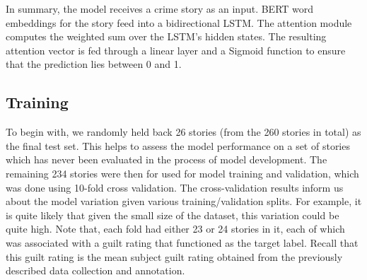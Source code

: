 \documentclass[11pt,a4paper]{article}
\begin{document}
In summary, the model receives a crime story as an input. BERT word embeddings for the story feed into a bidirectional LSTM. The attention module computes the weighted sum over the LSTM's hidden states. The resulting attention vector is fed through a linear layer and a Sigmoid function to ensure that the prediction lies between 0 and 1.


\subsection{Training}

To begin with, we randomly held back 26 stories (from the 260 stories in total) as the final test set. This helps to assess the model performance on a set of stories which has never been evaluated in the process of model development. The remaining 234 stories were then for used for model training and validation, which was done using 10-fold cross validation. The cross-validation results inform us about the model variation given various training/validation splits. For example, it is quite likely that given the small size of the dataset, this variation could be quite high. Note that, each fold had either 23 or 24 stories in it, each of which was associated with a guilt rating that functioned as the target label. Recall that this guilt rating is the mean subject guilt rating obtained from the previously described data collection and annotation. 




\end{document}
